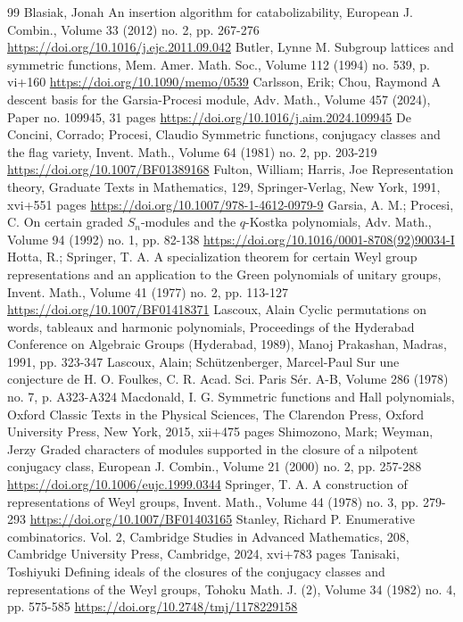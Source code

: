\documentclass[10pt]{amsart}
\theoremstyle{plain}
\theoremstyle{definition}
\theoremstyle{plain}
\theoremstyle{plain}
\theoremstyle{remark}
\theoremstyle{plain}
\theoremstyle{plain}
\begin{document}
\begin{thebibliography}{99}
 Blasiak, Jonah An insertion algorithm for catabolizability, European J. Combin., Volume 33 (2012) no. 2, pp. 267-276 \url{https://doi.org/10.1016/j.ejc.2011.09.042}
 Butler, Lynne M. Subgroup lattices and symmetric functions, Mem. Amer. Math. Soc., Volume 112 (1994) no. 539, p. vi+160 \url{https://doi.org/10.1090/memo/0539}
 Carlsson, Erik; Chou, Raymond A descent basis for the Garsia-Procesi module, Adv. Math., Volume 457 (2024), Paper no. 109945, 31 pages \url{https://doi.org/10.1016/j.aim.2024.109945}
 De Concini, Corrado; Procesi, Claudio Symmetric functions, conjugacy classes and the flag variety, Invent. Math., Volume 64 (1981) no. 2, pp. 203-219 \url{https://doi.org/10.1007/BF01389168}
 Fulton, William; Harris, Joe Representation theory, Graduate Texts in Mathematics, 129, Springer-Verlag, New York, 1991, xvi+551 pages \url{https://doi.org/10.1007/978-1-4612-0979-9}
 Garsia, A. M.; Procesi, C. On certain graded ${S}_n$-modules and the $q$-Kostka polynomials, Adv. Math., Volume 94 (1992) no. 1, pp. 82-138 \url{https://doi.org/10.1016/0001-8708(92)90034-I}
 Hotta, R.; Springer, T. A. A specialization theorem for certain Weyl group representations and an application to the Green polynomials of unitary groups, Invent. Math., Volume 41 (1977) no. 2, pp. 113-127 \url{https://doi.org/10.1007/BF01418371}
 Lascoux, Alain Cyclic permutations on words, tableaux and harmonic polynomials, Proceedings of the Hyderabad Conference on Algebraic Groups (Hyderabad, 1989), Manoj Prakashan, Madras, 1991, pp. 323-347
 Lascoux, Alain; Schützenberger, Marcel-Paul Sur une conjecture de H. O. Foulkes, C. R. Acad. Sci. Paris Sér. A-B, Volume 286 (1978) no. 7, p. A323-A324
 Macdonald, I. G. Symmetric functions and Hall polynomials, Oxford Classic Texts in the Physical Sciences, The Clarendon Press, Oxford University Press, New York, 2015, xii+475 pages
 Shimozono, Mark; Weyman, Jerzy Graded characters of modules supported in the closure of a nilpotent conjugacy class, European J. Combin., Volume 21 (2000) no. 2, pp. 257-288 \url{https://doi.org/10.1006/eujc.1999.0344}
 Springer, T. A. A construction of representations of Weyl groups, Invent. Math., Volume 44 (1978) no. 3, pp. 279-293 \url{https://doi.org/10.1007/BF01403165}
 Stanley, Richard P. Enumerative combinatorics. Vol. 2, Cambridge Studies in Advanced Mathematics, 208, Cambridge University Press, Cambridge, 2024, xvi+783 pages
 Tanisaki, Toshiyuki Defining ideals of the closures of the conjugacy classes and representations of the Weyl groups, Tohoku Math. J. (2), Volume 34 (1982) no. 4, pp. 575-585 \url{https://doi.org/10.2748/tmj/1178229158}
\end{thebibliography}
\end{document}
